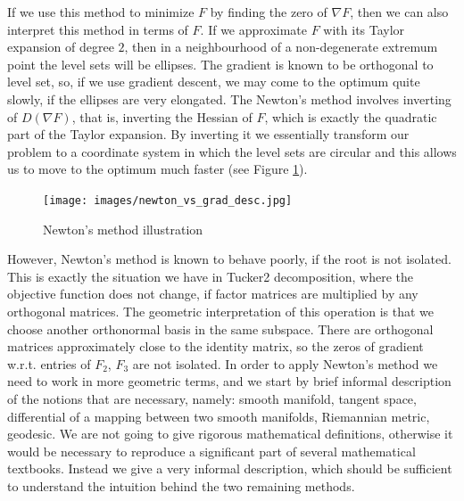 If we use this method to minimize $F$ by finding the zero of $\nabla F$, then
we can also interpret this method in terms of $F$. If we approximate $F$
with its Taylor expansion of degree $2$, then in a neighbourhood 
of a non-degenerate extremum point the level sets will be ellipses.
The gradient is known to be orthogonal to level set, so, if we use gradient descent,
we may come to the optimum quite slowly, if the ellipses are very elongated.
The Newton's method involves inverting of $D (\nabla F)$, that is, inverting 
the Hessian of $F$, which is exactly the quadratic part of the Taylor expansion.
By inverting it we essentially transform our problem to a coordinate system in which
the level sets are circular and this allows us to move to the optimum much faster (see Figure \ref{fig:newt_grad_comp}).

\begin{figure}
        \centering
                \texttt{[image: images/newton\_vs\_grad\_desc.jpg]}
        \caption{Newton's method illustration}
        \label{fig:newt_grad_comp}
\end{figure}


However, Newton's method is known to behave poorly, if the root is not isolated.
This is exactly the situation we have in Tucker2 decomposition, where the objective function
does not change, if factor matrices are multiplied by any orthogonal matrices. The geometric
interpretation of this operation is that we choose another orthonormal basis in the same subspace.
There are orthogonal matrices approximately close to the identity matrix, so the zeros
of gradient w.r.t. entries of $F_2$, $F_3$ are not isolated. In order to apply Newton's method
we need to work in more geometric terms, and we start by brief informal description of the notions
that are necessary, namely: smooth manifold, tangent space, differential of a mapping between two smooth manifolds,
Riemannian metric, geodesic.
We are not going to give 
rigorous mathematical definitions, otherwise it would be necessary
to reproduce a significant part of several mathematical textbooks.
Instead we give a very informal description, which should be sufficient
to understand the intuition behind the two remaining methods.


